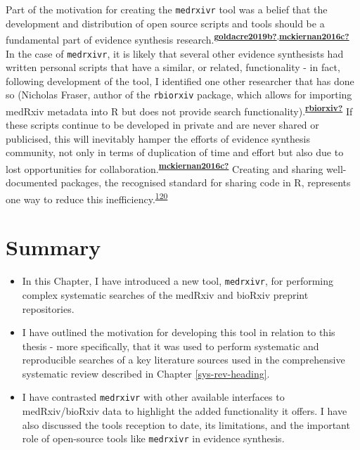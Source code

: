 \documentclass[a4paper, twoside]{templates/ociamthesis}
\begin{document}
Part of the motivation for creating the \texttt{medrxivr} tool was a belief that the development and distribution of open source scripts and tools should be a fundamental part of evidence synthesis research.\textsuperscript{\protect\hyperlink{ref-goldacre2019b}{\textbf{goldacre2019b?}},\protect\hyperlink{ref-mckiernan2016c}{\textbf{mckiernan2016c?}}} In the case of \texttt{medrxivr}, it is likely that several other evidence synthesists had written personal scripts that have a similar, or related, functionality - in fact, following development of the tool, I identified one other researcher that has done so (Nicholas Fraser, author of the \texttt{rbiorxiv} package, which allows for importing medRxiv metadata into R but does not provide search functionality).\textsuperscript{\protect\hyperlink{ref-rbiorxiv}{\textbf{rbiorxiv?}}} If these scripts continue to be developed in private and are never shared or publicised, this will inevitably hamper the efforts of evidence synthesis community, not only in terms of duplication of time and effort but also due to lost opportunities for collaboration.\textsuperscript{\protect\hyperlink{ref-mckiernan2016c}{\textbf{mckiernan2016c?}}} Creating and sharing well-documented packages, the recognised standard for sharing code in R, represents one way to reduce this inefficiency.\textsuperscript{\protect\hyperlink{ref-vuorre2020}{120}}

\hypertarget{summary-1}{%
\section{Summary}\label{summary-1}}

\begin{itemize}
\item
  In this Chapter, I have introduced a new tool, \texttt{medrxivr}, for performing complex systematic searches of the medRxiv and bioRxiv preprint repositories.
\item
  I have outlined the motivation for developing this tool in relation to this thesis - more specifically, that it was used to perform systematic and reproducible searches of a key literature sources used in the comprehensive systematic review described in Chapter \ref{sys-rev-heading}.
\item
  I have contrasted \texttt{medrxivr} with other available interfaces to medRxiv/bioRxiv data to highlight the added functionality it offers. I have also discussed the tools reception to date, its limitations, and the important role of open-source tools like \texttt{medrxivr} in evidence synthesis.
\end{itemize}
\end{document}

